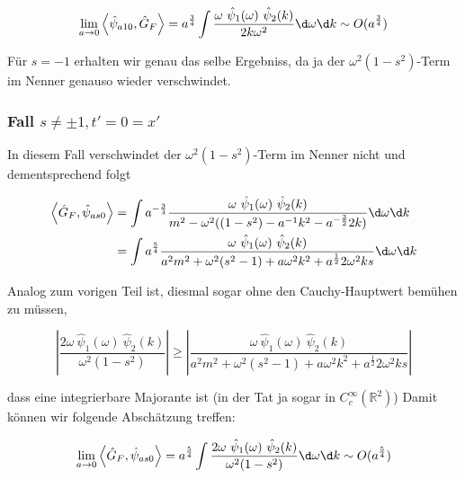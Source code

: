 \begin{equation}
    \lim_{a \rightarrow 0} \left< \hat\psi_{a10}, \hat G_F \right> =
    a^{\frac{3}{4}} \int \frac{
    \omega ~\hat \psi_1(\omega) ~\hat \psi_2(k)
    }
    {
    2k \omega^2
    }
    \d \omega \d k
    \sim O(a^{\frac{3}{4}})
    \label{eq:gf_s=1_tx=0}
\end{equation}

Für $s = -1$ erhalten wir genau das selbe Ergebniss, da ja der $\omega^2 (1-s^2)$-Term
im Nenner genauso wieder verschwindet.

\subsubsection*{Fall $s \neq \pm 1, t' = 0 = x'$}
In diesem Fall verschwindet der $\omega^2 (1-s^2)$-Term im Nenner nicht und
dementsprechend folgt

\begin{align*}
    \left< \hat G_F, \hat\psi_{as0} \right>
    &=
    \int a^{-\frac{3}{4}} \frac{
        \omega ~\hat \psi_1(\omega) ~\hat \psi_2(k)
    }
    {
        m^2-\omega^2 ((1-s^2) - a^{-1}k^2 - a^{-\frac{3}{2}}2 k )
    }
    \d \omega \d k \\
    &=
    \int a^{\frac{5}{4}} \frac{
        \omega ~\hat \psi_1(\omega) ~\hat \psi_2(k)
    }
    {
        a^2 m^2+\omega^2 (s^2-1) + a \omega^2 k^2 + a^{\frac{1}{2}}2 \omega^2 k s
    }
    \d \omega \d k
    \label{eq:gf_s=-1_tx=0}
\end{align*}

Analog zum vorigen Teil ist, diesmal sogar ohne den Cauchy-Hauptwert bemühen zu
müssen,


\begin{equation*}
    \left|
        \frac{2 \omega ~\hat \psi_1(\omega) ~\hat \psi_2(k)}{\omega^2 (1-s^2)}
    \right|
    \geq
    \left|
        \frac{
        \omega ~\hat \psi_1(\omega) ~\hat \psi_2(k)
    }
    {
        a^2 m^2+\omega^2 (s^2-1) + a \omega^2 k^2 + a^{\frac{1}{2}}2 \omega^2 k s
    }
    \right|
\end{equation*}

dass eine integrierbare Majorante ist (in der Tat ja sogar in $C_c^\infty (\mathbb{R}^2)$)
Damit können wir folgende Abschätzung treffen:

\begin{equation}
    \lim_{a \rightarrow 0} \left< \hat G_F, \hat\psi_{as0} \right> =
    a^{\frac{5}{4}} \int \frac{2 \omega ~\hat \psi_1(\omega) ~\hat \psi_2(k)}
    {\omega^2 (1-s^2)}
    \d \omega \d k
    \sim O(a^{\frac{5}{4}})
    \label{eq:gf_s_neq_1_xt=0}
\end{equation}


